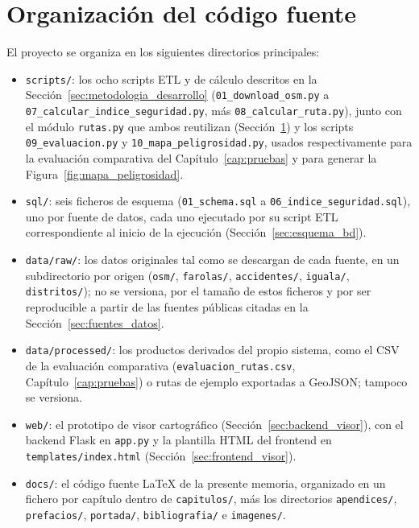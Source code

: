 \section{Organización del código fuente}
\label{sec:organizacion_codigo}

El proyecto se organiza en los siguientes directorios principales:

\begin{itemize}
    \item \texttt{scripts/}: los ocho scripts ETL y de cálculo descritos en la Sección~\ref{sec:metodologia_desarrollo} (\texttt{01\_download\_osm.py} a \texttt{07\_calcular\_indice\_seguridad.py}, más \texttt{08\_calcular\_ruta.py}), junto con el módulo \texttt{rutas.py} que ambos reutilizan (Sección~\ref{sec:organizacion_codigo}) y los scripts \texttt{09\_evaluacion.py} y \texttt{10\_mapa\_peligrosidad.py}, usados respectivamente para la evaluación comparativa del Capítulo~\ref{cap:pruebas} y para generar la Figura~\ref{fig:mapa_peligrosidad}.
    \item \texttt{sql/}: seis ficheros de esquema (\texttt{01\_schema.sql} a \texttt{06\_indice\_seguridad.sql}), uno por fuente de datos, cada uno ejecutado por su script ETL correspondiente al inicio de la ejecución (Sección~\ref{sec:esquema_bd}).
    \item \texttt{data/raw/}: los datos originales tal como se descargan de cada fuente, en un subdirectorio por origen (\texttt{osm/}, \texttt{farolas/}, \texttt{accidentes/}, \texttt{iguala/}, \texttt{distritos/}); no se versiona, por el tamaño de estos ficheros y por ser reproducible a partir de las fuentes públicas citadas en la Sección~\ref{sec:fuentes_datos}.
    \item \texttt{data/processed/}: los productos derivados del propio sistema, como el CSV de la evaluación comparativa (\texttt{evaluacion\_rutas.csv}, Capítulo~\ref{cap:pruebas}) o rutas de ejemplo exportadas a GeoJSON; tampoco se versiona.
    \item \texttt{web/}: el prototipo de visor cartográfico (Sección~\ref{sec:backend_visor}), con el backend Flask en \texttt{app.py} y la plantilla HTML del frontend en \texttt{templates/index.html} (Sección~\ref{sec:frontend_visor}).
    \item \texttt{docs/}: el código fuente \LaTeX{} de la presente memoria, organizado en un fichero por capítulo dentro de \texttt{capitulos/}, más los directorios \texttt{apendices/}, \texttt{prefacios/}, \texttt{portada/}, \texttt{bibliografia/} e \texttt{imagenes/}.
\end{itemize}

